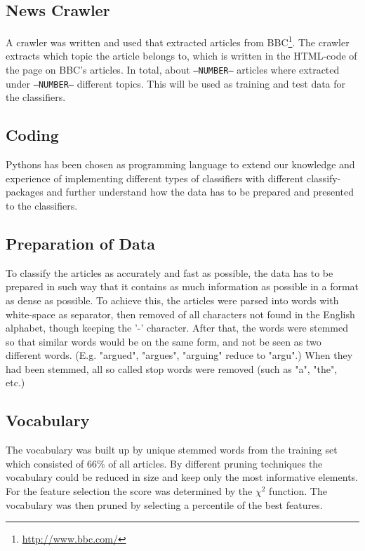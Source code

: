 \subsection{News Crawler}
A crawler was written and used that extracted articles from BBC\footnote{\url{http://www.bbc.com/}}. The crawler extracts which topic the article belongs to, which is written in the HTML-code of the page on BBC's articles. In total, about \texttt{--NUMBER--} articles where extracted under \texttt{--NUMBER--} different topics. This will be used as training and test data for the classifiers.
\subsection{Coding}
Pythons has been chosen as programming language to extend our knowledge and experience of implementing different types of classifiers with different classify-packages and further understand how the data has to be prepared and presented to the classifiers.
\subsection{Preparation of Data}
To classify the articles as accurately and fast as possible, the data has to be prepared in such way that it contains as much information as possible in a format as dense as possible. To achieve this, the articles were parsed into words with white-space as separator, then removed of all characters not found in the English alphabet, though keeping the '-' character. After that, the words were stemmed so that similar words would be on the same form, and not be seen as two different words. (E.g. "argued", "argues", "arguing" reduce to "argu".) When they had been stemmed, all so called stop words were removed (such as "a", "the", etc.)
\subsection{Vocabulary}
The vocabulary was built up by unique stemmed words from the training set which consisted of 66\% of all articles. By different pruning techniques the vocabulary could be reduced in size and keep only the most informative elements. For the feature selection the score was determined by the $\chi^2$ function. The vocabulary was then pruned by selecting a percentile of the best features.
